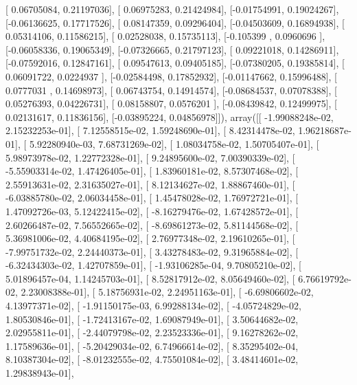 \documentclass{article}
\begin{document}
       [ 0.06705084,  0.21197036],
       [ 0.06975283,  0.21424984],
       [-0.01754991,  0.19024267],
       [-0.06136625,  0.17717526],
       [ 0.08147359,  0.09296404],
       [-0.04503609,  0.16894938],
       [ 0.05314106,  0.11586215],
       [ 0.02528038,  0.15735113],
       [-0.105399  ,  0.0960696 ],
       [-0.06058336,  0.19065349],
       [-0.07326665,  0.21797123],
       [ 0.09221018,  0.14286911],
       [-0.07592016,  0.12847161],
       [ 0.09547613,  0.09405185],
       [-0.07380205,  0.19385814],
       [ 0.06091722,  0.0224937 ],
       [-0.02584498,  0.17852932],
       [-0.01147662,  0.15996488],
       [ 0.0777031 ,  0.14698973],
       [ 0.06743754,  0.14914574],
       [-0.08684537,  0.07078388],
       [ 0.05276393,  0.04226731],
       [ 0.08158807,  0.0576201 ],
       [-0.08439842,  0.12499975],
       [ 0.02131617,  0.11836156],
       [-0.03895224,  0.04856978]]), array([[ -1.99088248e-02,   2.15232253e-01],
       [  7.12558515e-02,   1.59248690e-01],
       [  8.42314478e-02,   1.96218687e-01],
       [  5.92280940e-03,   7.68731269e-02],
       [  1.08034758e-02,   1.50705407e-01],
       [  5.98973978e-02,   1.22772328e-01],
       [  9.24895600e-02,   7.00390339e-02],
       [ -5.55903314e-02,   1.47426405e-01],
       [  1.83960181e-02,   8.57307468e-02],
       [  2.55913631e-02,   2.31635027e-01],
       [  8.12134627e-02,   1.88867460e-01],
       [ -6.03885780e-02,   2.06034458e-01],
       [  1.45478028e-02,   1.76972721e-01],
       [  1.47092726e-03,   5.12422415e-02],
       [ -8.16279476e-02,   1.67428572e-01],
       [  2.60266487e-02,   7.56552665e-02],
       [ -8.69861273e-02,   5.81144568e-02],
       [  5.36981006e-02,   4.40684195e-02],
       [  2.76977348e-02,   2.19610265e-01],
       [ -7.99751732e-02,   2.24440373e-01],
       [  3.43278483e-02,   9.31965884e-02],
       [ -6.32434303e-02,   1.42707859e-01],
       [ -1.93106285e-04,   9.70805210e-02],
       [  5.01896457e-04,   1.14245703e-01],
       [  8.52817912e-02,   8.05649460e-02],
       [  6.76619792e-02,   2.23008388e-01],
       [  5.18756931e-02,   2.24951163e-01],
       [ -6.69806602e-02,   4.13977371e-02],
       [ -1.91150175e-03,   6.99288134e-02],
       [ -4.05724829e-02,   1.80530846e-01],
       [ -1.72413167e-02,   1.69087949e-01],
       [  3.50644682e-02,   2.02955811e-01],
       [ -2.44079798e-02,   2.23523336e-01],
       [  9.16278262e-02,   1.17589636e-01],
       [ -5.20429034e-02,   6.74966614e-02],
       [  8.35295402e-04,   8.10387304e-02],
       [ -8.01232555e-02,   4.75501084e-02],
       [  3.48414601e-02,   1.29838943e-01],
\end{document}
